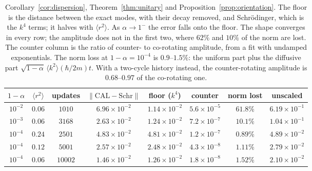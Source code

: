 \documentclass[11pt]{amsart}
\theoremstyle{definition}
\theoremstyle{remark}
\begin{document}
\begin{table}[h]
\centering\small
\begin{tabular}{cccccccc}
\toprule
$1-\alpha$ & $\langle r^2\rangle$ & updates & $\lVert\text{CAL}-\text{Schr}\rVert$ & floor ($k^4$) & counter & norm lost & unscaled\\
\midrule
$10^{-2}$ & $0.06$ & $1010$ & $6.96\times10^{-2}$ & $1.14\times10^{-2}$ & $5.6\times10^{-5}$ & $61.8\%$ & $6.19\times10^{-1}$\\
$10^{-3}$ & $0.06$ & $3168$ & $2.63\times10^{-2}$ & $1.24\times10^{-2}$ & $7.2\times10^{-7}$ & $10.1\%$ & $1.04\times10^{-1}$\\
$10^{-4}$ & $0.24$ & $2501$ & $4.83\times10^{-2}$ & $4.81\times10^{-2}$ & $1.2\times10^{-7}$ & $0.89\%$ & $4.89\times10^{-2}$\\
$10^{-4}$ & $0.12$ & $5001$ & $2.57\times10^{-2}$ & $2.48\times10^{-2}$ & $4.3\times10^{-8}$ & $1.11\%$ & $2.79\times10^{-2}$\\
$10^{-4}$ & $0.06$ & $10002$ & $1.46\times10^{-2}$ & $1.26\times10^{-2}$ & $1.8\times10^{-8}$ & $1.52\%$ & $2.10\times10^{-2}$\\
\bottomrule
\end{tabular}
\caption{Corollary~\ref{cor:dispersion}, Theorem~\ref{thm:unitary} and Proposition~\ref{prop:orientation}. The floor is the distance between the exact modes, with their decay removed, and Schr\"odinger, which is the $k^4$ terms; it halves with $\langle r^2\rangle$. As $\alpha\to1^-$ the error falls onto the floor. The shape converges in every row; the amplitude does not in the first two, where $62\%$ and $10\%$ of the norm are lost. The counter column is the ratio of counter- to co-rotating amplitude, from a fit with undamped exponentials. The norm loss at $1-\alpha=10^{-4}$ is $0.9$--$1.5\%$: the uniform part plus the diffusive part $\sqrt{1-\alpha}\,\langle k^2\rangle(\hbar/2m)t$. With a two-cycle history instead, the counter-rotating amplitude is $0.68$--$0.97$ of the co-rotating one.}
\label{tab:packet}
\end{table}
\end{document}
